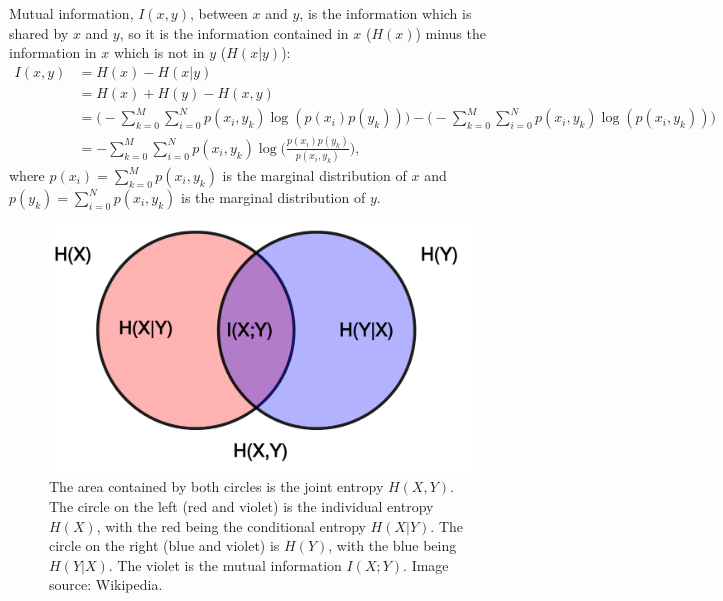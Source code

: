\documentclass[]{article}
\begin{document}
Mutual information, $I(x,y)$, between $x$ and $y$, is the information which is shared by $x$ and $y$, so it is the information contained in $x$ ($H(x)$) minus the information in $x$ which is not in $y$ ($H(x|y)$):
\begin{align}
\label{eq:MI}
I(x,y) & =  H(x) - H(x|y) \\
& = H(x) + H(y) -H(x,y) \\
\label{gibbsformat}
& =  \Big( -\sum_{k=0}^M\sum_{i=0}^N p(x_i,y_k)\log(p(x_i)p(y_k))\Big)-\Big( -\sum_{k=0}^M\sum_{i=0}^N p(x_i,y_k)\log(p(x_i,y_k))\Big) \\
\label{MIcondensed}
&  = -\sum_{k=0}^M\sum_{i=0}^N p(x_i,y_k)\log\big(\frac{p(x_i) p(y_k)}{p(x_i,y_k)}\big) ,
\end{align}
where $p(x_i) = \sum_{k=0}^M p(x_i,y_k)$ is the marginal distribution of $x$ and $p(y_k) = \sum_{i=0}^N p(x_i,y_k)$ is the marginal distribution of $y$. 
\begin{figure}
      \centering
      \includegraphics[width=1.\linewidth]{entropyvenn.png}
    \caption{The area contained by both circles is the joint entropy $H(X,Y)$. The circle on the left (red and violet) is the individual entropy $H(X)$, with the red being the conditional entropy $H(X|Y)$. The circle on the right (blue and violet) is $H(Y)$, with the blue being $H(Y|X)$. The violet is the mutual information $I(X;Y)$. Image source: Wikipedia.}
    \label{fig:venn}
\end{figure}
\end{document}
